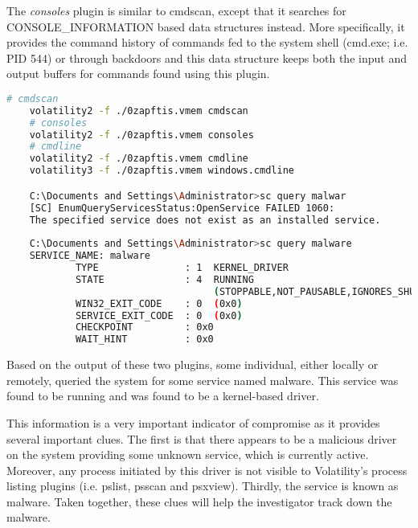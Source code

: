 The \textit{consoles} plugin is similar to cmdscan, except that it searches for CONSOLE\_INFORMATION based data structures instead. More specifically, it provides the command history of commands fed to the system shell (cmd.exe; i.e. PID 544) or through backdoors and this data structure keeps both the input and output buffers for commands found using this plugin.

\begin{lstlisting}[language=bash]
    # cmdscan
    volatility2 -f ./0zapftis.vmem cmdscan
    # consoles
    volatility2 -f ./0zapftis.vmem consoles
    # cmdline
    volatility2 -f ./0zapftis.vmem cmdline
    volatility3 -f ./0zapftis.vmem windows.cmdline

    C:\Documents and Settings\Administrator>sc query malwar                         
    [SC] EnumQueryServicesStatus:OpenService FAILED 1060:                                                                                                    
    The specified service does not exist as an installed service.                   
                                                                                                                                                                
    C:\Documents and Settings\Administrator>sc query malware                                                                                                   
    SERVICE_NAME: malware                                                           
            TYPE               : 1  KERNEL_DRIVER                                   
            STATE              : 4  RUNNING                                         
                                    (STOPPABLE,NOT_PAUSABLE,IGNORES_SHUTDOWN)       
            WIN32_EXIT_CODE    : 0  (0x0)                                           
            SERVICE_EXIT_CODE  : 0  (0x0)                                           
            CHECKPOINT         : 0x0                                                
            WAIT_HINT          : 0x0  
\end{lstlisting}

Based on the output of these two plugins, some individual, either locally or remotely, queried the system for some service named malware. This service was found to be running and was found to be a kernel-based driver.

This information is a very important indicator of compromise as it provides several important clues. The first is that there appears to be a malicious driver on the system providing some unknown service, which is currently active. Moreover, any process initiated by this driver is not visible to Volatility’s process listing plugins (i.e. pslist, psscan and psxview). Thirdly, the service is known as malware. Taken together, these clues will help the investigator track down the malware.

